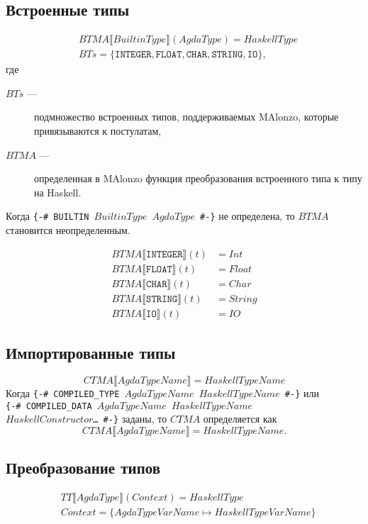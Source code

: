 \subsection{Встроенные типы}
\begin{align*}
&BTMA\llbracket BuiltinType \rrbracket(AgdaType) = HaskellType\\
&BTs = \{\texttt{INTEGER}, \texttt{FLOAT}, \texttt{CHAR}, \texttt{STRING}, \texttt{IO}\},
\end{align*}
где
\begin{description}
\item[\(BTs\) ---] подмножество встроенных типов, поддерживаемых MAlonzo, которые
привязываются к постулатам,
\item[\(BTMA\) ---] определенная в MAlonzo функция преобразования встроенного
типа к типу на Haskell.
\end{description}

Когда \texttt{\{-\# BUILTIN \(BuiltinType\) \(AgdaType\) \#-\}} не определена,
то \(BTMA\) становится неопределенным.

\begin{align*}
BTMA\llbracket \texttt{INTEGER} \rrbracket(t) &= Int\\
BTMA\llbracket \texttt{FLOAT} \rrbracket(t) &= Float\\
BTMA\llbracket \texttt{CHAR} \rrbracket(t) &= Char\\
BTMA\llbracket \texttt{STRING} \rrbracket(t) &= String\\
BTMA\llbracket \texttt{IO} \rrbracket(t) &= IO
\end{align*}

\subsection{Импортированные типы}
\[
CTMA\llbracket AgdaTypeName \rrbracket = HaskellTypeName
\]
Когда \texttt{\{-\# COMPILED\_TYPE \(AgdaTypeName\) \(HaskellTypeName\) \#-\}} или\\
\texttt{\{-\# COMPILED\_DATA \(AgdaTypeName\) \(HaskellTypeName\)\\
\(HaskellConstructor\)\dots\ \#-\}} заданы, то \(CTMA\) определяется как
\[
CTMA\llbracket AgdaTypeName \rrbracket = HaskellTypeName.
\]

\subsection{Преобразование типов}
\begin{align*}
&TT\llbracket AgdaType \rrbracket(Context) = HaskellType\\
&Context = \{ AgdaTypeVarName \mapsto HaskellTypeVarName \}
\end{align*}

